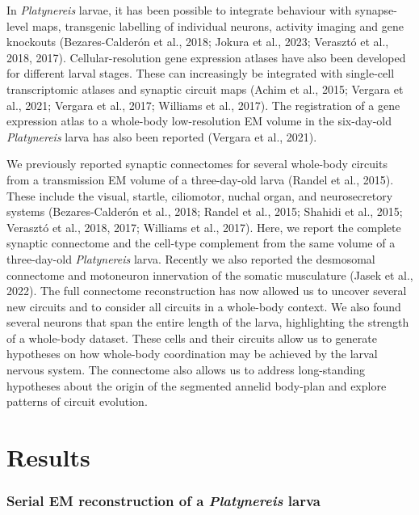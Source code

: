 \documentclass[
  11pt,
]{article}
\begin{document}
In \emph{Platynereis} larvae, it has been possible to integrate
behaviour with synapse-level maps, transgenic labelling of individual
neurons, activity imaging and gene knockouts (Bezares-Calderón et al.,
2018; Jokura et al., 2023; Verasztó et al., 2018, 2017).
Cellular-resolution gene expression atlases have also been developed for
different larval stages. These can increasingly be integrated with
single-cell transcriptomic atlases and synaptic circuit maps (Achim et
al., 2015; Vergara et al., 2021; Vergara et al., 2017; Williams et al.,
2017). The registration of a gene expression atlas to a whole-body
low-resolution EM volume in the six-day-old \emph{Platynereis} larva has
also been reported (Vergara et al., 2021).

We previously reported synaptic connectomes for several whole-body
circuits from a transmission EM volume of a three-day-old larva (Randel
et al., 2015). These include the visual, startle, ciliomotor, nuchal
organ, and neurosecretory systems (Bezares-Calderón et al., 2018; Randel
et al., 2015; Shahidi et al., 2015; Verasztó et al., 2018, 2017;
Williams et al., 2017). Here, we report the complete synaptic connectome
and the cell-type complement from the same volume of a three-day-old
\emph{Platynereis} larva. Recently we also reported the desmosomal
connectome and motoneuron innervation of the somatic musculature (Jasek
et al., 2022). The full connectome reconstruction has now allowed us to
uncover several new circuits and to consider all circuits in a
whole-body context. We also found several neurons that span the entire
length of the larva, highlighting the strength of a whole-body dataset.
These cells and their circuits allow us to generate hypotheses on how
whole-body coordination may be achieved by the larval nervous system.
The connectome also allows us to address long-standing hypotheses about
the origin of the segmented annelid body-plan and explore patterns of
circuit evolution.

\section{Results}\label{results}

\subsubsection{\texorpdfstring{Serial EM reconstruction of a
\emph{Platynereis}
larva}{Serial EM reconstruction of a Platynereis larva}}\label{serial-em-reconstruction-of-a-platynereis-larva}
\end{document}
